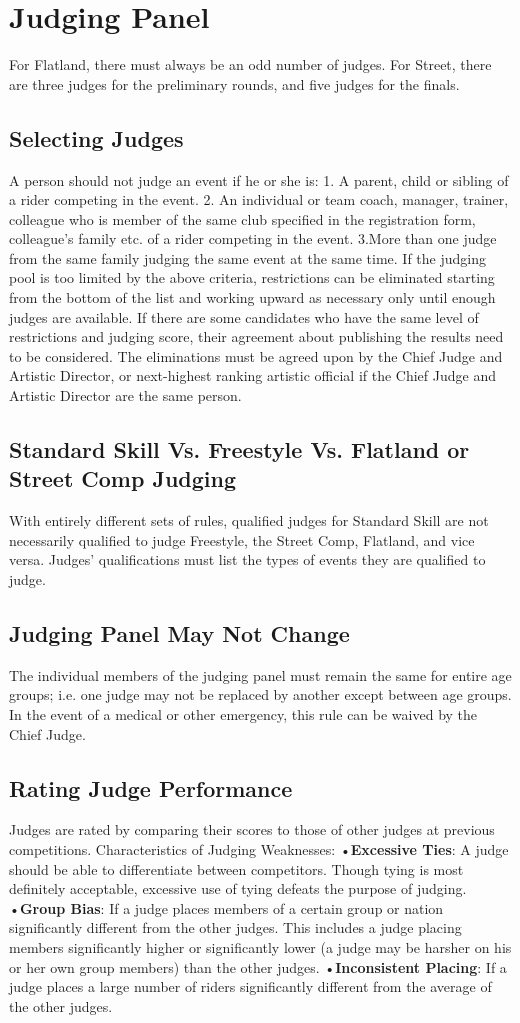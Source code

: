 \section{Judging Panel}
For Flatland, there must always be an odd number of judges. For Street, there are three judges for the preliminary rounds, and five judges for the finals.
\subsection{Selecting Judges}
A person should not judge an event if he or she is:
1. A parent, child or sibling of a rider competing in the event.
2. An individual or team coach, manager, trainer, colleague who is member of the same club specified in the registration form, colleague’s family etc. of a rider competing in the event.
3.More than one judge from the same family judging the same event at the same time. 
If the judging pool is too limited by the above criteria, restrictions can be eliminated starting from the bottom of the list
and working upward as necessary only until enough judges are available. If there are some candidates who have the same level of restrictions and judging score, their agreement about publishing the results need to be considered. The eliminations must be agreed upon by the Chief Judge and Artistic Director, or next-highest ranking artistic official if the Chief Judge and Artistic Director are the same person.
\subsection{Standard Skill Vs. Freestyle Vs. Flatland or Street Comp Judging}
With entirely different sets of rules, qualified judges for Standard Skill are not necessarily qualified to judge Freestyle, the Street Comp, Flatland, and vice versa. Judges' qualifications must list the types of events they are qualified to judge.
\subsection{Judging Panel May Not Change}
The individual members of the judging panel must remain the same for entire age groups; i.e. one judge may not be replaced by another except between age groups. In the event of a medical or other emergency, this rule can be waived by the Chief Judge.
\subsection{Rating Judge Performance}
Judges are rated by comparing their scores to those of other judges at previous competitions. Characteristics of Judging
Weaknesses:
•\textbf{Excessive Ties}: A judge should be able to differentiate between competitors. Though tying is most definitely
acceptable, excessive use of tying defeats the purpose of judging.
•\textbf{Group Bias}: If a judge places members of a certain group or nation significantly different from the other judges. This includes a judge placing members significantly higher or significantly lower (a judge may be harsher on his or her own group members) than the other judges.
•\textbf{Inconsistent Placing}: If a judge places a large number of riders significantly different from the average of the other judges.

